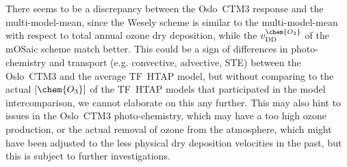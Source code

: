 \documentclass[gmd, manuscript]{copernicus}
\begin{document}
There seems to be a discrepancy between the Oslo~CTM3 response and the multi-model-mean, since the Wesely scheme is similar to the multi-model-mean with respect to total annual ozone dry deposition, while the $v_\text{DD}^\chem{O_3}$ of the mOSaic scheme match better. This could be a sign of differences in photo-chemistry and transport (e.g. convective, advective, STE) between the Oslo~CTM3 and the average TF~HTAP model, but without comparing to the actual $[\chem{O_3}]$ of the TF~HTAP models that participated in the model intercomparison, we cannot elaborate on this any further. This may also hint to issues in the Oslo~CTM3 photo-chemistry, which may have a too high ozone production, or the actual removal of ozone from the atmosphere, which might have been adjusted to the less physical dry deposition velocities in the past, but this is subject to further investigations.
\end{document}
